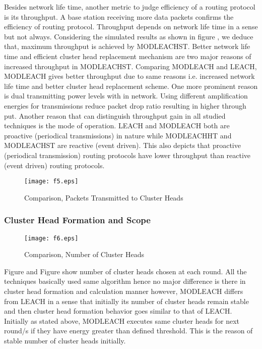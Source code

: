 \documentclass[10pt, conference, compsocconf]{IEEEtran}
\begin{document}
Besides network life time, another metric to judge efficiency of a routing protocol is its throughput. A base station receiving more data packets confirms the efficiency of routing protocol. Throughput depends on network life time in a sense but not always. Considering the simulated results as shown in figure , we deduce that, maximum throughput is achieved by MODLEACHST. Better network life time and efficient cluster head replacement mechanism are two major reasons of increased throughput in MODLEACHST. Comparing MODLEACH and LEACH, MODLEACH gives better throughput due to same reasons i.e. increased network life time and better cluster head replacement scheme. One more prominent reason is dual transmitting power levels with in network. Using different amplification energies for transmissions reduce packet drop ratio resulting in higher through put. Another reason that can distinguish throughput gain in all studied techniques is the mode of operation. LEACH and MODLEACH both are proactive (periodical transmissions) in nature while MODLEACHHT and MODLEACHST are reactive (event driven). This also depicts that proactive (periodical transmission) routing protocols have lower throughput than reactive (event driven) routing protocols.

\begin{figure}
\begin{center}
\texttt{[image: f5.eps]}
\caption{Comparison, Packets Transmitted to Cluster Heads}
\end{center}
\end{figure}

\subsubsection{Cluster Head Formation and Scope}

\begin{figure}
\begin{center}
\texttt{[image: f6.eps]}
\caption{Comparison, Number of  Cluster Heads}
\end{center}
\end{figure}

Figure  and Figure  show number of cluster heads chosen at each round. All the techniques basically used same algorithm hence no major difference is there in cluster head formation and calculation manner however, MODLEACH differs from LEACH in a sense that initially its number of cluster heads remain stable and then cluster head formation behavior goes similar to that of LEACH. Initially as stated above, MODLEACH executes same cluster heads for next round/s if they have energy greater than defined threshold. This is the reason of stable number of cluster heads initially.
\end{document}
